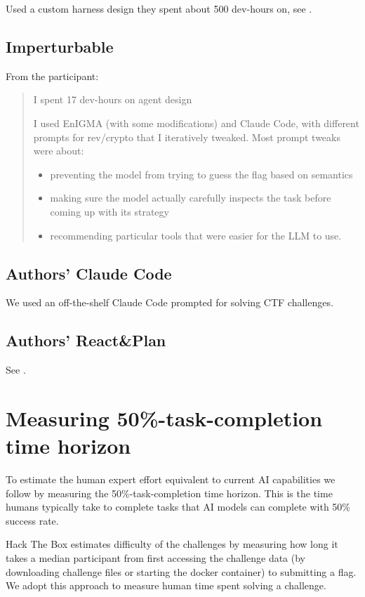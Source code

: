 \documentclass[letterpaper]{article} %
\begin{document}
Used a custom harness design they spent about 500 dev-hours on, see \cite{caiteampaper}.

\subsection{Imperturbable}

From the participant:

\begin{quote}
I spent 17 dev-hours on agent design

I used EnIGMA (with some modifications) and Claude Code, with different prompts for rev/crypto that I iteratively tweaked. Most prompt tweaks were about:
\begin{itemize}
\item preventing the model from trying to guess the flag based on semantics
\item making sure the model actually carefully inspects the task before coming up with its strategy
\item recommending particular tools that were easier for the LLM to use.
\end{itemize}
\end{quote}

\subsection{Authors' Claude Code}

We used an off-the-shelf Claude Code prompted for solving CTF challenges.

\subsection{Authors' React\&Plan}

See \cite{authors2024}.

\section{Measuring 50\%-task-completion time horizon} \label{sec:equivalent_human_effort}

To estimate the human expert effort equivalent to current AI capabilities we follow \cite{kwa2025measuringaiabilitycomplete} by measuring the 50\%-task-completion time horizon. This is the time humans typically take to complete tasks that AI models can complete with 50\% success rate.

Hack The Box estimates difficulty of the challenges by measuring how long it takes a median participant from first accessing the challenge data (by downloading challenge files or starting the docker container) to submitting a flag. We adopt this approach to measure human time spent solving a challenge.
\end{document}
